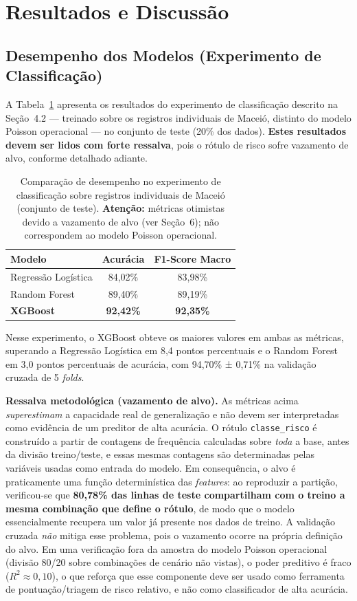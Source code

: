 \documentclass[12pt]{article}
\begin{document}
\section{Resultados e Discussão}
\subsection{Desempenho dos Modelos (Experimento de Classificação)}
A Tabela~\ref{tab:modelos} apresenta os resultados do experimento de
classificação descrito na Seção~4.2 --- treinado sobre os registros
individuais de Maceió, distinto do modelo Poisson operacional --- no conjunto
de teste (20\% dos dados). \textbf{Estes resultados devem ser lidos com forte
ressalva}, pois o rótulo de risco sofre vazamento de alvo, conforme detalhado
adiante.

\begin{table}[ht]
\centering
\caption{Comparação de desempenho no experimento de classificação sobre
  registros individuais de Maceió (conjunto de teste). \textbf{Atenção:}
  métricas otimistas devido a vazamento de alvo (ver Seção~6); não
  correspondem ao modelo Poisson operacional.}
\label{tab:modelos}
\begin{tabular}{|l|c|c|}
\hline
\textbf{Modelo} & \textbf{Acurácia} & \textbf{F1-Score Macro} \\
\hline
Regressão Logística  & 84,02\% & 83,98\% \\
Random Forest        & 89,40\% & 89,19\% \\
\textbf{XGBoost}     & \textbf{92,42\%} & \textbf{92,35\%} \\
\hline
\end{tabular}
\end{table}

Nesse experimento, o XGBoost obteve os maiores valores em ambas as métricas,
superando a Regressão Logística em 8,4 pontos percentuais e o Random Forest em
3,0 pontos percentuais de acurácia, com 94,70\% ± 0,71\% na validação cruzada
de 5 \textit{folds}.

\textbf{Ressalva metodológica (vazamento de alvo).} As métricas acima
\emph{superestimam} a capacidade real de generalização e não devem ser
interpretadas como evidência de um preditor de alta acurácia. O rótulo
\texttt{classe\_risco} é construído a partir de contagens de frequência
calculadas sobre \emph{toda} a base, antes da divisão treino/teste, e essas
mesmas contagens são determinadas pelas variáveis usadas como entrada do
modelo. Em consequência, o alvo é praticamente uma função determinística das
\textit{features}: ao reproduzir a partição, verificou-se que \textbf{80,78\%
das linhas de teste compartilham com o treino a mesma combinação que define o
rótulo}, de modo que o modelo essencialmente recupera um valor já presente nos
dados de treino. A validação cruzada \emph{não} mitiga esse problema, pois o
vazamento ocorre na própria definição do alvo. Em uma verificação fora da
amostra do modelo Poisson operacional (divisão 80/20 sobre combinações de
cenário não vistas), o poder preditivo é fraco ($R^2 \approx 0{,}10$), o que
reforça que esse componente deve ser usado como ferramenta de
pontuação/triagem de risco relativo, e não como classificador de alta
acurácia.
\end{document}
